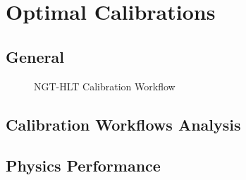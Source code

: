 \chapter{Optimal Calibrations}
\section{General} %



\begin{figure}[h!]	
\centering
\caption{NGT-HLT Calibration Workflow}
\label{fig:NGT-HLT_CalibrationWorkflow}
\end{figure}

\section{Calibration Workflows Analysis}


%

\section{Physics Performance}

